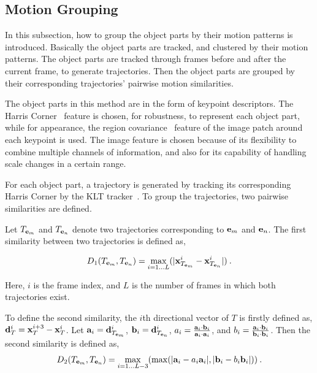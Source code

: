 \subsection{Motion Grouping}
In this subsection, how to group the object parts by their motion patterns is introduced. Basically the object parts are tracked, and clustered by their motion patterns. The object parts are tracked through frames before and after the current frame, to generate trajectories. Then the object parts are grouped by their corresponding trajectories' pairwise motion similarities.

The object parts in this method are in the form of keypoint descriptors. The Harris Corner~\citep{harris} feature is chosen, for robustness, to represent each object part, while for appearance, the region covariance~\citep{regionc} feature of the image patch around each keypoint is used. The image feature is chosen because of its flexibility to combine multiple channels of information, and also for its capability of handling scale changes in a certain range.

For each object part, a trajectory is generated by tracking its corresponding Harris Corner by the KLT tracker~\citep{ij2}. To group the trajectories, two pairwise similarities are defined.

Let $T_{{\bf{e}}_m}$ and $T_{{\bf{e}}_n}$ denote two trajectories corresponding to ${{\bf{e}}_m}$ and ${{\bf{e}}_n}$. The first similarity between two trajectories is defined as,

\[
 {D_1}(T_{{\bf{e}}_m},T_{{\bf{e}}_n}) = \mathop {\max }\limits_{i=1...L} (|{\bf{x}}^i_{T_{{\bf{e}}_m}}-{\bf{x}}^i_{T_{{\bf{e}}_n}}|)\:.
\]

Here,  $i$ is the frame index, and $L$ is   the number of frames  in which both trajectories exist.

To define the second similarity, the $i$th directional vector of $T$ is firstly defined as, ${\bf{d}}^i_T={\bf{x}}^{i+3}_{T}-{\bf{x}}^i_{T}$. Let ${\bf{a}}_i={\bf{d}}^i_{T_{{\bf{e}}_m}}$, ${\bf{b}}_i={\bf{d}}^i_{T_{{\bf{e}}_n}}$, $a_i=\frac{{{{\bf{a}}_i}\cdot{{\bf{b}}_i}}}{{{{\bf{a}}_i}\cdot{{\bf{a}}_i}}}$, and $b_i=\frac{{{{\bf{a}}_i}\cdot{{\bf{b}}_i}}}{{{{\bf{b}}_i}\cdot{{\bf{b}}_i}}}$. Then the second similarity is defined as,
\[
{D_2}(T_{{\bf{e}}_m},T_{{\bf{e}}_n})= \mathop {\max }\limits_{i=1...L-3} (\max (|{{\bf{a}}_i} - a_i {{\bf{a}}_i}|,|{{\bf{b}}_i} - b_i{{\bf{b}}_i}|))\:.
\]


